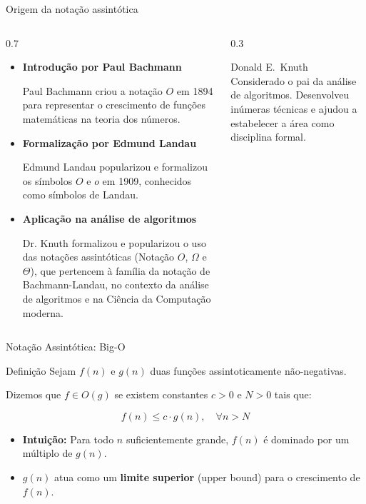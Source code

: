 \documentclass[aspectratio=169]{beamer}
\begin{document}
\begin{frame}[shrink]{Origem  da notação assintótica }
	\begin{columns}
		\begin{column}{0.7\textwidth}
			{\small
			\begin{itemize}
				\item \textbf{Introdução por Paul Bachmann}

				Paul Bachmann criou a notação $O$ em 1894 para representar o crescimento de funções matemáticas na teoria dos números.

				\item \textbf{Formalização por Edmund Landau}

				Edmund Landau popularizou e formalizou os símbolos $O$ e $o$ em 1909, conhecidos como símbolos de Landau.

				\item \textbf{Aplicação na análise de algoritmos}

					Dr. Knuth formalizou e popularizou o uso das notações assintóticas (Notação $O$, $\Omega$ e $\Theta$), que pertencem à família da notação de Bachmann-Landau, no contexto da análise de algoritmos e na Ciência da Computação moderna. 
			\end{itemize}
			}
		\end{column}
		\begin{column}{0.3\textwidth}
			\begin{block}{Donald E.\ Knuth}
				Considerado o pai da análise de algoritmos. Desenvolveu inúmeras técnicas e ajudou a estabelecer a área como disciplina formal.
			\end{block}
		\end{column}
	\end{columns}  %
\end{frame}


\begin{frame}{Notação Assintótica: Big-O}
    \begin{block}{Definição}
        Sejam $f(n)$ e $g(n)$ duas funções assintoticamente não-negativas.

    Dizemos que $f \in O(g)$ se existem constantes $c > 0$ e $N > 0$ tais que:
    
    \end{block}
    \[ f(n) \leq c \cdot g(n), \quad \forall n > N \]

    \vspace{0.5cm}
    \begin{itemize}
        \item \textbf{Intuição:} Para todo $n$ suficientemente grande, $f(n)$ é dominado por um múltiplo de $g(n)$.
        \item $g(n)$ atua como um \textbf{limite superior} (upper bound) para o crescimento de $f(n)$.
    \end{itemize}
\end{frame}
\end{document}
